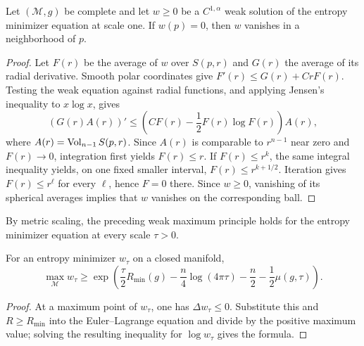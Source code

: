 \begin{lemma}
\label{lem:chow-iii-ch17-weak-strong-maximum-principle}
Let $(\mathcal M,g)$ be complete and let $w\ge0$ be a $C^{1,\alpha}$ weak
solution of the entropy minimizer equation at scale one.  If $w(p)=0$, then
$w$ vanishes in a neighborhood of $p$.
\end{lemma}
\begin{proof}
Let $F(r)$ be the average of $w$ over $S(p,r)$ and $G(r)$ the average of its
radial derivative.  Smooth polar coordinates give
$F'(r)\le G(r)+CrF(r)$.  Testing the weak equation against radial functions,
and applying Jensen's inequality to $x\log x$, gives
\[
 (G(r)A(r))'\le\left(CF(r)-\frac12F(r)\log F(r)\right)A(r),
\]
where $A(r)=\operatorname{Vol}_{n-1}S(p,r)$.  Since $A(r)$ is comparable to $r^{n-1}$
near zero and $F(r)\to0$, integration first yields $F(r)\le r$.  If
$F(r)\le r^k$, the same integral inequality yields, on one fixed smaller
interval, $F(r)\le r^{k+1/2}$.  Iteration gives $F(r)\le r^\ell$ for every
$\ell$, hence $F=0$ there.  Since $w\ge0$, vanishing of its spherical
averages implies that $w$ vanishes on the corresponding ball.
\end{proof}

\begin{remark}
\label{rem:chow-iii-ch17-weak-maximum-principle-scaling}
By metric scaling, the preceding weak maximum principle holds for the
entropy minimizer equation at every scale $\tau>0$.
\end{remark}

\begin{lemma}
\label{lem:chow-iii-ch17-minimizer-maximum-lower-bound}
For an entropy minimizer $w_\tau$ on a closed manifold,
\[
 \max_{\mathcal M}w_\tau\ge
 \exp\left(\frac\tau2R_{\min}(g)-\frac n4\log(4\pi\tau)
 -\frac n2-\frac12\mu(g,\tau)\right).
\]
\end{lemma}
\begin{proof}
At a maximum point of $w_\tau$, one has $\Delta w_\tau\le0$.  Substitute
this and $R\ge R_{\min}$ into the Euler--Lagrange equation and divide by the
positive maximum value; solving the resulting inequality for
$\log w_\tau$ gives the formula.
\end{proof}

